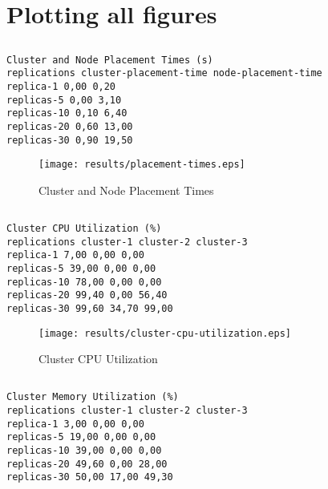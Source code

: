 \documentclass{elsart}
\begin{document}
\section{Plotting all figures}
\subsection{}

\begin{lstlisting}[caption={Cluster and Node Placement Times}]
Cluster and Node Placement Times (s)
replications cluster-placement-time node-placement-time
replica-1 0,00 0,20
replicas-5 0,00 3,10
replicas-10 0,10 6,40
replicas-20 0,60 13,00
replicas-30 0,90 19,50
\end{lstlisting}

\begin{figure}[ht]
\centering
\texttt{[image: results/placement-times.eps]}
\caption{Cluster and Node Placement Times}\label{fig:placement-times.eps}
\end{figure}

\subsection{}

\begin{lstlisting}[caption={Cluster CPU Utilization}]
Cluster CPU Utilization (%)
replications cluster-1 cluster-2 cluster-3
replica-1 7,00 0,00 0,00
replicas-5 39,00 0,00 0,00
replicas-10 78,00 0,00 0,00
replicas-20 99,40 0,00 56,40
replicas-30 99,60 34,70 99,00
\end{lstlisting}

\begin{figure}[ht]
\centering
\texttt{[image: results/cluster-cpu-utilization.eps]}
\caption{Cluster CPU Utilization}\label{fig:cluster-cpu-utilization.eps}
\end{figure}

\subsection{}

\begin{lstlisting}[caption={Cluster Memory Utilization}]
Cluster Memory Utilization (%)
replications cluster-1 cluster-2 cluster-3
replica-1 3,00 0,00 0,00
replicas-5 19,00 0,00 0,00
replicas-10 39,00 0,00 0,00
replicas-20 49,60 0,00 28,00
replicas-30 50,00 17,00 49,30
\end{lstlisting}
\end{document}

